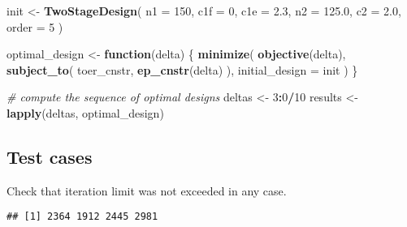\documentclass[
]{book}
\newenvironment{Shaded}{\begin{snugshade}}{\end{snugshade}}
\newcommand{\CommentTok}[1]{\textcolor[rgb]{0.56,0.35,0.01}{\textit{#1}}}
\newcommand{\ControlFlowTok}[1]{\textcolor[rgb]{0.13,0.29,0.53}{\textbf{#1}}}
\newcommand{\DataTypeTok}[1]{\textcolor[rgb]{0.13,0.29,0.53}{#1}}
\newcommand{\DecValTok}[1]{\textcolor[rgb]{0.00,0.00,0.81}{#1}}
\newcommand{\FloatTok}[1]{\textcolor[rgb]{0.00,0.00,0.81}{#1}}
\newcommand{\KeywordTok}[1]{\textcolor[rgb]{0.13,0.29,0.53}{\textbf{#1}}}
\newcommand{\NormalTok}[1]{#1}
\newcommand{\OperatorTok}[1]{\textcolor[rgb]{0.81,0.36,0.00}{\textbf{#1}}}
\newcommand{\StringTok}[1]{\textcolor[rgb]{0.31,0.60,0.02}{#1}}
\begin{document}
\begin{Shaded}
\begin{Highlighting}[]
\NormalTok{init \textless{}{-}}\StringTok{ }\KeywordTok{TwoStageDesign}\NormalTok{(}
    \DataTypeTok{n1    =} \DecValTok{150}\NormalTok{,}
    \DataTypeTok{c1f   =} \DecValTok{0}\NormalTok{,}
    \DataTypeTok{c1e   =} \FloatTok{2.3}\NormalTok{,}
    \DataTypeTok{n2    =} \FloatTok{125.0}\NormalTok{,}
    \DataTypeTok{c2    =} \FloatTok{2.0}\NormalTok{,}
    \DataTypeTok{order =} \DecValTok{5}
\NormalTok{)}

\NormalTok{optimal\_design \textless{}{-}}\StringTok{ }\ControlFlowTok{function}\NormalTok{(delta) \{}
    \KeywordTok{minimize}\NormalTok{(}
        \KeywordTok{objective}\NormalTok{(delta),}
        \KeywordTok{subject\_to}\NormalTok{(}
\NormalTok{            toer\_cnstr,}
            \KeywordTok{ep\_cnstr}\NormalTok{(delta)}
\NormalTok{        ),}
        \DataTypeTok{initial\_design =}\NormalTok{ init}
\NormalTok{    )}
\NormalTok{\}}

\CommentTok{\# compute the sequence of optimal designs}
\NormalTok{deltas  \textless{}{-}}\StringTok{ }\DecValTok{3}\OperatorTok{:}\DecValTok{0}\OperatorTok{/}\DecValTok{10}
\NormalTok{results \textless{}{-}}\StringTok{ }\KeywordTok{lapply}\NormalTok{(deltas, optimal\_design)}
\end{Highlighting}
\end{Shaded}

\hypertarget{test-cases-6}{%
\subsection{Test cases}\label{test-cases-6}}

Check that iteration limit was not exceeded in any case.

\begin{Shaded}
\end{Shaded}

\begin{verbatim}
## [1] 2364 1912 2445 2981
\end{verbatim}

\begin{Shaded}
\end{Shaded}
\end{document}
